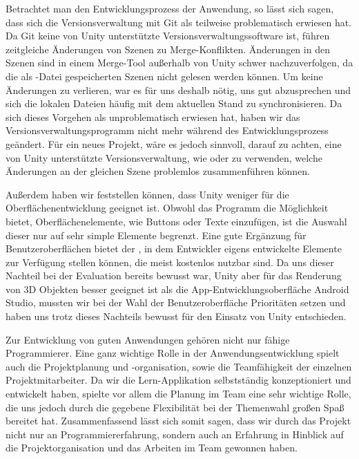 Betrachtet man den Entwicklungsprozess der Anwendung, so lässt sich sagen, dass sich die Versionsverwaltung mit Git als teilweise problematisch erwiesen hat.
Da Git keine von Unity unterstützte Versionsverwaltungssoftware ist, führen zeitgleiche Änderungen von Szenen zu Merge-Konflikten.
Änderungen in den Szenen sind in einem Merge-Tool außerhalb von Unity schwer nachzuverfolgen, da die als -Datei gespeicherten Szenen nicht gelesen werden können. 
Um keine Änderungen zu verlieren, war es für uns deshalb nötig, uns gut abzusprechen und sich die lokalen Dateien häufig mit dem aktuellen Stand zu synchronisieren.
Da sich dieses Vorgehen als unproblematisch erwiesen hat, haben wir das Versionsverwaltungsprogramm nicht mehr während des Entwicklungsprozess geändert.
Für ein neues Projekt, wäre es jedoch sinnvoll, darauf zu achten, eine von Unity unterstützte Versionsverwaltung, wie  oder  zu verwenden, welche Änderungen an der gleichen Szene problemlos zusammenführen können.

Außerdem haben wir feststellen können, dass Unity weniger für die Oberflächenentwicklung geeignet ist. 
Obwohl das Programm die Möglichkeit bietet, Oberflächenelemente, wie Buttons oder Texte einzufügen, ist die Auswahl dieser nur auf sehr simple Elemente begrenzt.
Eine gute Ergänzung für Benutzeroberflächen bietet der , in dem Entwickler eigens entwickelte Elemente zur Verfügung stellen können, die meist kostenlos nutzbar sind.
Da uns dieser Nachteil bei der Evaluation bereits bewusst war, Unity aber für das Renderung von 3D Objekten besser geeignet ist als die App-Entwicklungsoberfläche Android Studio, mussten wir bei der Wahl der Benutzeroberfläche Prioritäten setzen und haben uns trotz dieses Nachteils bewusst für den Einsatz von Unity entschieden.

Zur Entwicklung von guten Anwendungen gehören nicht nur fähige Programmierer.
Eine ganz wichtige Rolle in der Anwendungsentwicklung spielt auch die Projektplanung und -organisation, sowie die Teamfähigkeit der einzelnen Projektmitarbeiter.
Da wir die Lern-Applikation selbstständig konzeptioniert und entwickelt haben, spielte vor allem die Planung im Team eine sehr wichtige Rolle, die uns jedoch durch die gegebene Flexibilität bei der Themenwahl großen Spaß bereitet hat.
Zusammenfassend lässt sich somit sagen, dass wir durch das Projekt nicht nur an Programmiererfahrung, sondern auch an Erfahrung in Hinblick auf die Projektorganisation und das Arbeiten im Team gewonnen haben. 